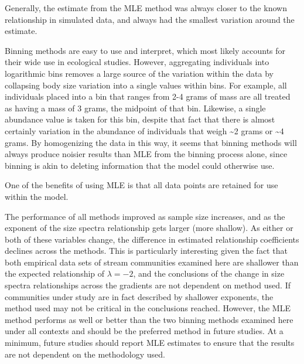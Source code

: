 \documentclass[
]{article}
\begin{document}
Generally, the estimate from the MLE method was always closer to the
known relationship in simulated data, and always had the smallest
variation around the estimate.

Binning methods are easy to use and interpret, which most likely
accounts for their wide use in ecological studies. However, aggregating
individuals into logarithmic bins removes a large source of the
variation within the data by collapsing body size variation into a
single values within bins. For example, all individuals placed into a
bin that ranges from 2-4 grams of mass are all treated as having a mass
of 3 grams, the midpoint of that bin. Likewise, a single abundance value
is taken for this bin, despite that fact that there is almost certainly
variation in the abundance of individuals that weigh \textasciitilde2
grams or \textasciitilde4 grams. By homogenizing the data in this way,
it seems that binning methods will always produce noisier results than
MLE from the binning process alone, since binning is akin to deleting
information that the model could otherwise use.

One of the benefits of using MLE is that all data points are retained
for use within the model.

The performance of all methods improved as sample size increases, and as
the exponent of the size spectra relationship gets larger (more
shallow). As either or both of these variables change, the difference in
estimated relationship coefficients declines across the methods. This is
particularly interesting given the fact that both empirical data sets of
stream communities examined here are shallower than the expected
relationship of \(\lambda = -2\), and the conclusions of the change in
size spectra relationships across the gradients are not dependent on
method used. If communities under study are in fact described by
shallower exponents, the method used may not be critical in the
conclusions reached. However, the MLE method performs as well or better
than the two binning methods examined here under all contexts and should
be the preferred method in future studies. At a minimum, future studies
should report MLE estimates to ensure that the results are not dependent
on the methodology used.
\end{document}
